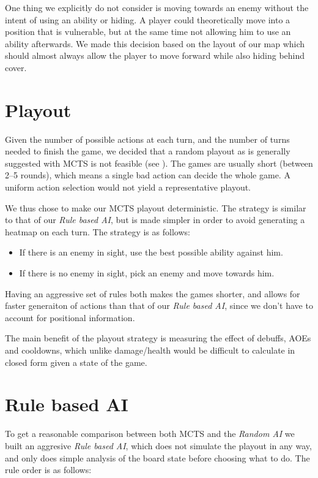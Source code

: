 One thing we explicitly do not consider is moving towards an enemy without the intent
of using an ability or hiding. A player could theoretically move into a position
that is vulnerable, but at the same time not allowing him to use an ability afterwards.
We made this decision based on the layout of our map  which should
almost always allow the player to move forward while also hiding behind cover.

\section{Playout}

Given the number of possible actions at each turn, and the number of turns
needed to finish the game, we decided that a random playout as is generally
suggested with MCTS is not feasible (see \citet{mcts-survey}). The games
are usually short (between 2--5 rounds), which means a single bad action can decide
the whole game. A uniform action selection would not yield a representative playout.

We thus chose to make our MCTS playout deterministic. The strategy
is similar to that of our \emph{Rule based AI}, but is made simpler in order
to avoid generating a heatmap on each turn. The strategy is as follows:

\begin{itemize}
\item If there is an enemy in sight, use the best possible ability against him.
\item If there is no enemy in sight, pick an enemy and move towards him.
\end{itemize}

Having an aggressive set of rules both makes the games shorter, and allows for faster
generaiton of actions than that of our \emph{Rule based AI}, since we don't have to account
for positional information.

The main benefit of the playout strategy is measuring the effect of debuffs, AOEs and cooldowns,
which unlike damage/health would be difficult to calculate in closed form given a state of the game.


\section{Rule based AI}

To get a reasonable comparison between both MCTS and the \emph{Random AI} we
built an aggresive \emph{Rule based AI}, which does not simulate the playout in
any way, and only does simple analysis of the board state before choosing what
to do. The rule order is as follows:

